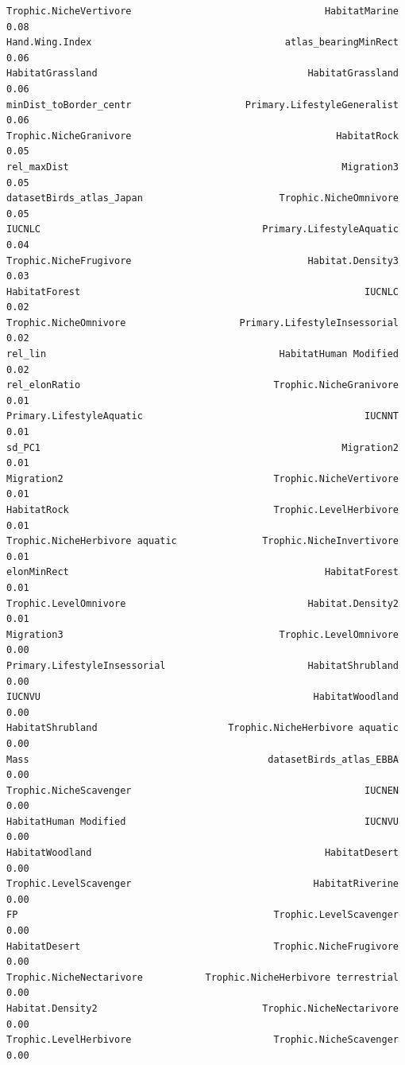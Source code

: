 \documentclass[
  letterpaper,
  DIV=11,
  numbers=noendperiod]{scrreprt}
\begin{document}
\begin{verbatim}
Trophic.NicheVertivore                                  HabitatMarine    0.08
Hand.Wing.Index                                  atlas_bearingMinRect    0.06
HabitatGrassland                                     HabitatGrassland    0.06
minDist_toBorder_centr                    Primary.LifestyleGeneralist    0.06
Trophic.NicheGranivore                                    HabitatRock    0.05
rel_maxDist                                                Migration3    0.05
datasetBirds_atlas_Japan                        Trophic.NicheOmnivore    0.05
IUCNLC                                       Primary.LifestyleAquatic    0.04
Trophic.NicheFrugivore                               Habitat.Density3    0.03
HabitatForest                                                  IUCNLC    0.02
Trophic.NicheOmnivore                    Primary.LifestyleInsessorial    0.02
rel_lin                                         HabitatHuman Modified    0.02
rel_elonRatio                                  Trophic.NicheGranivore    0.01
Primary.LifestyleAquatic                                       IUCNNT    0.01
sd_PC1                                                     Migration2    0.01
Migration2                                     Trophic.NicheVertivore    0.01
HabitatRock                                    Trophic.LevelHerbivore    0.01
Trophic.NicheHerbivore aquatic               Trophic.NicheInvertivore    0.01
elonMinRect                                             HabitatForest    0.01
Trophic.LevelOmnivore                                Habitat.Density2    0.01
Migration3                                      Trophic.LevelOmnivore    0.00
Primary.LifestyleInsessorial                         HabitatShrubland    0.00
IUCNVU                                                HabitatWoodland    0.00
HabitatShrubland                       Trophic.NicheHerbivore aquatic    0.00
Mass                                          datasetBirds_atlas_EBBA    0.00
Trophic.NicheScavenger                                         IUCNEN    0.00
HabitatHuman Modified                                          IUCNVU    0.00
HabitatWoodland                                         HabitatDesert    0.00
Trophic.LevelScavenger                                HabitatRiverine    0.00
FP                                             Trophic.LevelScavenger    0.00
HabitatDesert                                  Trophic.NicheFrugivore    0.00
Trophic.NicheNectarivore           Trophic.NicheHerbivore terrestrial    0.00
Habitat.Density2                             Trophic.NicheNectarivore    0.00
Trophic.LevelHerbivore                         Trophic.NicheScavenger    0.00

\end{verbatim}
\end{document}
